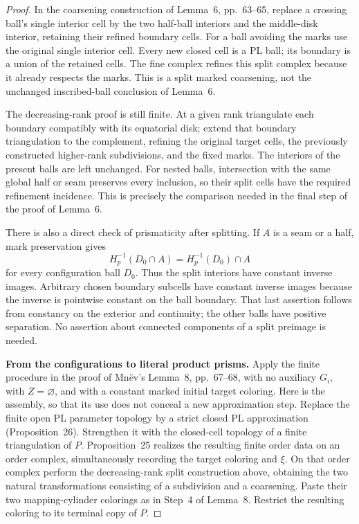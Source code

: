 \begin{proof}
In the coarsening construction of Lemma~6, pp.~63--65, replace a
crossing ball's single interior cell by the two half-ball interiors
and the middle-disk interior, retaining their refined boundary cells.
For a ball avoiding the marks use the original single interior cell.
Every new closed cell is a PL ball; its boundary is a union of the
retained cells. The fine complex refines this split complex because
it already respects the marks. This is a split marked coarsening,
not the unchanged inscribed-ball conclusion of Lemma~6.

The decreasing-rank proof is still finite. At a given rank triangulate
each boundary compatibly with its equatorial disk; extend that boundary
triangulation to the complement, refining the original target cells,
the previously constructed higher-rank subdivisions, and the fixed
marks. The interiors of the present balls are left unchanged.
For nested balls, intersection with the same global half or seam
preserves every inclusion, so their split cells have the required
refinement incidence. This is precisely the comparison needed in
the final step of the proof of Lemma~6.

There is also a direct check of prismaticity after splitting. If \(A\)
is a seam or a half, mark preservation gives
\[
 H_p^{-1}(D_0\cap A)=H_p^{-1}(D_0)\cap A
 \tag{147.10}
\]
for every configuration ball \(D_0\). Thus the split interiors have
constant inverse images. Arbitrary chosen boundary subcells have
constant inverse images because the inverse is pointwise constant
on the ball boundary. That last assertion follows from constancy on
the exterior and continuity; the other balls have positive separation.
No assertion about connected components of a split preimage is needed.

\textbf{From the configurations to literal product prisms.}\quad
Apply the finite procedure in the proof of Mn\"ev's Lemma~8,
pp.~67--68, with no auxiliary \(G_i\), with \(Z=\varnothing\), and
with a constant marked initial target coloring.
Here is the assembly, so that its use does not conceal a new
approximation step. Replace the finite open PL parameter topology
by a strict closed PL approximation (Proposition~26). Strengthen it
with the closed-cell topology of a finite triangulation of \(P\).
Proposition~25 realizes the resulting finite order data on an order
complex, simultaneously recording the target coloring and \(\xi\).
On that order complex perform the decreasing-rank split construction
above, obtaining the two natural transformations consisting of a
subdivision and a coarsening. Paste their two mapping-cylinder
colorings as in Step~4 of Lemma~8. Restrict the resulting coloring
to its terminal copy of \(P\).


\end{proof}
